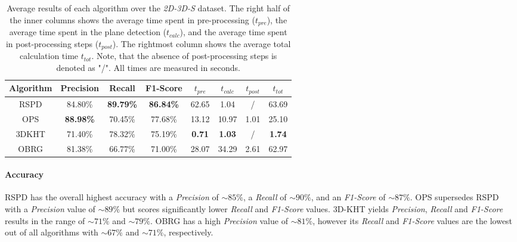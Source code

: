 \documentclass[main.tex]{subfiles}
\begin{document}
\begin{table}[H]
    \centering
    \begin{tabular}{c|cccccc|c}
        Algorithm & Precision        & Recall           & F1-Score         & $t_{pre}$     & $t_{calc}$    & $t_{post}$ & $t_{tot}$     \\ \hline
        RSPD      & 84.80\%          & \textbf{89.79\%} & \textbf{86.84\%} & 62.65         & 1.04          & /          & 63.69         \\
        OPS       & \textbf{88.98\%} & 70.45\%          & 77.68\%          & 13.12         & 10.97         & 1.01       & 25.10         \\
        3DKHT     & 71.40\%          & 78.32\%          & 75.19\%          & \textbf{0.71} & \textbf{1.03} & /          & \textbf{1.74} \\
        OBRG      & 81.38\%          & 66.77\%          & 71.00\%          & 28.07         & 34.29         & 2.61       & 62.97
    \end{tabular}
    \caption[Overall 2D-3D-S Results]{Average results of each algorithm over the \textit{2D-3D-S} dataset. The right half of the inner columns shows the average time spent in
        pre-processing ($t_{pre}$), the average time spent in the plane detection ($t_{calc}$), and the average time spent in post-processing steps ($t_{post}$).
        The rightmost column shows the average total calculation time $t_{tot}$.
        Note, that the absence of post-processing steps is denoted as "/". All times are measured in seconds.}
    \label{tab:res-3d2ds-total}
\end{table}

\paragraph{Accuracy}
RSPD has the overall highest accuracy with a \textit{Precision} of ${\sim}85\%$, a \textit{Recall} of ${\sim}90\%$, and an \textit{F1-Score} of ${\sim}87\%$.
OPS supersedes RSPD with a \textit{Precision} value of ${\sim}89\%$ but scores significantly lower \textit{Recall} and \textit{F1-Score} values.
3D-KHT yields \textit{Precision}, \textit{Recall} and \textit{F1-Score} results in the range of ${\sim}71\%$ and ${\sim}79\%$.
OBRG has a high \textit{Precision} value of ${\sim}81\%$, however its \textit{Recall} and \textit{F1-Score} values are the lowest out of all algorithms
with ${\sim}67\%$ and ${\sim}71\%$, respectively.
\end{document}
